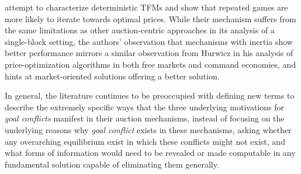 \citet{gafni2024barriers} attempt to characterize deterministic TFMs and show that repeated games are more likely to iterate towards optimal prices. While their mechanism suffers from the same limitations as other auction-centric approaches in its analysis of a single-block setting, the authors' observation that mechanisms with inertia show better performance mirrors a similar observation from Hurwicz in his analysis of price-optimization algorithms in both free markets and command economies, and hints at market-oriented solutions offering a better solution.

In general, the literature continues to be preoccupied with defining new terms to describe the extremely specific ways that the three underlying motivations for \textit{goal conflicts} manifest in their auction mechanisms, instead of focusing on the underlying reasons why \textit{goal conflict} exists in these mechanisms, asking whether any overarching equilibrium exist in which these conflicts might not exist, and what forms of information would need to be revealed or made computable in any fundamental solution capable of eliminating them generally.

